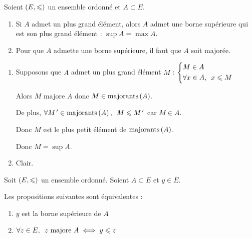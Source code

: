 \begin{prop}
Soient \(\left(E,\leqslant\right)\) un ensemble ordonné et \(A\subset E\).

\begin{enumerate}
\item Si \(A\) admet un plus grand élément, alors \(A\) admet une borne supérieure qui est son plus grand élément : \(\sup A=\max A\).

\item Pour que \(A\) admette une borne supérieure, il faut que \(A\) soit majorée.
\end{enumerate}
\end{prop}

\begin{dem}
\begin{enumerate}
\item Supposons que \(A\) admet un plus grand élément \(M\) : \(\begin{dcases}M\in A \\ \quantifs{\forall x\in A}x\leq M\end{dcases}\)

Alors \(M\) majore \(A\) donc \(M\in\mathrm{majorants}\left(A\right)\).

De plus, \(\quantifs{\forall M\prim\in\majo{A}}M\leq M\prim\) car \(M\in A\).

Donc \(M\) est le plus petit élément de \(\mathrm{majorants}\left(A\right)\).

Donc \(M=\sup A\).

\item Clair.
\end{enumerate}
\end{dem}

\begin{prop}
Soit \(\left(E,\leqslant\right)\) un ensemble ordonné. Soient \(A\subset E\) et \(y\in E\).

Les propositions suivantes sont équivalentes : \begin{enumerate}
\item \(y\) est la borne supérieure de \(A\)

\item \(\quantifs{\forall z\in E}z\text{ majore }A\iff y\leq z\)
\end{enumerate}
\end{prop}

